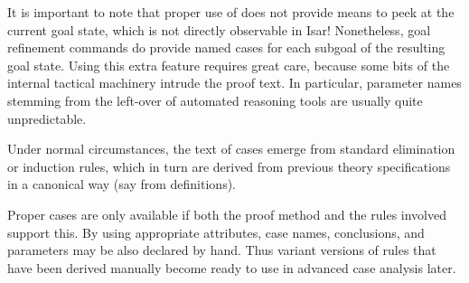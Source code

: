 \begin{isabellebody}
\begin{isamarkuptext}
  \medskip It is important to note that proper use of \hyperlink{command.case}{\mbox{}} does not provide means to peek at the current goal state,
  which is not directly observable in Isar!  Nonetheless, goal
  refinement commands do provide named cases 
  for each subgoal  of the resulting goal state.
  Using this extra feature requires great care, because some bits of
  the internal tactical machinery intrude the proof text.  In
  particular, parameter names stemming from the left-over of automated
  reasoning tools are usually quite unpredictable.

  Under normal circumstances, the text of cases emerge from standard
  elimination or induction rules, which in turn are derived from
  previous theory specifications in a canonical way (say from
  \hyperlink{command.inductive}{\mbox{}} definitions).

  \medskip Proper cases are only available if both the proof method
  and the rules involved support this.  By using appropriate
  attributes, case names, conclusions, and parameters may be also
  declared by hand.  Thus variant versions of rules that have been
  derived manually become ready to use in advanced case analysis
  later.


\end{isamarkuptext}
\end{isabellebody}
